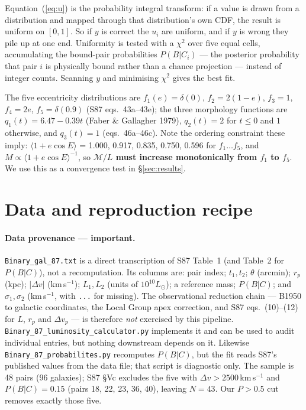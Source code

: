 \documentclass[11pt]{article}
\newcommand{\ML}{\ensuremath{\mathcal{M}/L}}
\begin{document}
Equation~(\ref{eq:u}) is the probability integral transform: if a value is
drawn from a distribution and mapped through that distribution's own CDF, the
result is uniform on $[0,1]$. So if $y$ is correct the $u_i$ are uniform, and
if $y$ is wrong they pile up at one end. Uniformity is tested with a $\chi^2$
over five equal cells, accumulating the bound-pair probabilities $P(B|C_i)$
--- the posterior probability that pair $i$ is physically bound rather than a
chance projection --- instead of integer counts. Scanning $y$ and minimising
$\chi^2$ gives the best fit.

The five eccentricity distributions are $f_1(e)=\delta(0)$, $f_2=2(1-e)$,
$f_3=1$, $f_4=2e$, $f_5=\delta(0.9)$ (S87 eqs.~43a--43e); the three morphology
functions are $q_1(t)=6.47-0.39t$ (Faber \& Gallagher 1979), $q_2(t)=2$ for
$t\le0$ and $1$ otherwise, and $q_3(t)=1$ (eqs.~46a--46c). Note the ordering
constraint these imply: $\langle 1+e\cos E\rangle$ = 1.000, 0.917, 0.835,
0.750, 0.596 for $f_1 \ldots f_5$, and $M \propto \langle 1+e\cos
E\rangle^{-1}$, so \textbf{\ML{} must increase monotonically from $f_1$ to
$f_5$}. We use this as a convergence test in \S\ref{sec:results}.

\section{Data and reproduction recipe}
\label{sec:repro}

\paragraph{Data provenance --- important.} \texttt{Binary\_gal\_87.txt} is a
direct transcription of S87 Table~1 (and Table~2 for $P(B|C)$), not a
recomputation. Its columns are: pair index; $t_1,t_2$; $\theta$ (arcmin);
$r_p$ (kpc); $|\Delta v|$ (km\,s$^{-1}$); $L_1, L_2$ (units of
$10^{10}L_\odot$); a reference mass; $P(B|C)$; and $\sigma_1,\sigma_2$
(km\,s$^{-1}$, with \texttt{...} for missing). The observational reduction
chain --- B1950 to galactic coordinates, the Local Group apex correction, and
S87 eqs.~(10)--(12) for $L$, $r_p$ and $\Delta v_p$ --- is therefore
\emph{not} exercised by this pipeline.
\texttt{Binary\_87\_luminosity\_calculator.py} implements it and can be used to
audit individual entries, but nothing downstream depends on it. Likewise
\texttt{Binary\_87\_probabilites.py} recomputes $P(B|C)$, but the fit reads
S87's published values from the data file; that script is diagnostic only.
The sample is 48 pairs (96 galaxies); S87 \S Vc excludes the five with
$\Delta v > 2500$\,km\,s$^{-1}$ and $P(B|C)=0.15$ (pairs 18, 22, 23, 36, 40),
leaving $N=43$. Our $P>0.5$ cut removes exactly those five.
\end{document}
